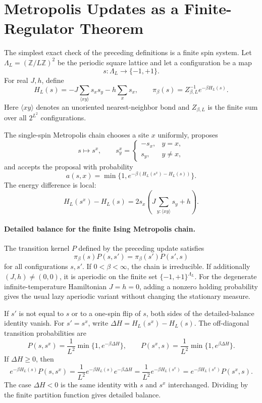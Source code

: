 \section{Metropolis Updates as a Finite-Regulator Theorem}

The simplest exact check of the preceding definitions is a finite spin system.
Let \(\Lambda_L=(\mathbb Z/L\mathbb Z)^2\) be the periodic square lattice and
let a configuration be a map
\[
  s:\Lambda_L\to\{-1,+1\}.
\]
For real \(J,h\), define
\[
  H_L(s)
  =
  -J\sum_{\langle xy\rangle}s_xs_y-h\sum_xs_x ,
  \qquad
  \pi_\beta(s)=Z_{\beta,L}^{-1}e^{-\beta H_L(s)} .
\]
Here \(\langle xy\rangle\) denotes an unoriented nearest-neighbor bond and
\(Z_{\beta,L}\) is the finite sum over all \(2^{L^2}\) configurations.

The single-spin Metropolis chain chooses a site \(x\) uniformly, proposes
\[
  s\longmapsto s^x,\qquad
  s^x_y=
  \begin{cases}
    -s_x,& y=x,\\
    s_y,& y\neq x,
  \end{cases}
\]
and accepts the proposal with probability
\[
  a(s,x)=\min\{1,e^{-\beta(H_L(s^x)-H_L(s))}\}.
\]
The energy difference is local:
\[
  H_L(s^x)-H_L(s)
  =
  2s_x\left(J\sum_{y:\langle xy\rangle}s_y+h\right).
\]

\paragraph{Detailed balance for the finite Ising Metropolis chain.}
The transition kernel \(P\) defined by the preceding update satisfies
\[
  \pi_\beta(s)P(s,s')=\pi_\beta(s')P(s',s)
\]
for all configurations \(s,s'\).  If \(0<\beta<\infty\), the chain is
irreducible.  If additionally \((J,h)\neq(0,0)\), it is aperiodic on the
finite set \(\{-1,+1\}^{\Lambda_L}\).  For the degenerate infinite-temperature
Hamiltonian \(J=h=0\), adding a nonzero holding probability gives the usual
lazy aperiodic variant without changing the stationary measure.

If \(s'\) is not equal to \(s\) or to a one-spin flip of \(s\), both sides of
the detailed-balance identity vanish.  For \(s'=s^x\), write
\(\Delta H=H_L(s^x)-H_L(s)\).  The off-diagonal transition probabilities are
\[
  P(s,s^x)=\frac1{L^2}\min\{1,e^{-\beta\Delta H}\},
  \qquad
  P(s^x,s)=\frac1{L^2}\min\{1,e^{\beta\Delta H}\}.
\]
If \(\Delta H\geq0\), then
\[
  e^{-\beta H_L(s)}P(s,s^x)
  =
  \frac1{L^2}e^{-\beta H_L(s)}e^{-\beta\Delta H}
  =
  \frac1{L^2}e^{-\beta H_L(s^x)}
  =
  e^{-\beta H_L(s^x)}P(s^x,s).
\]
The case \(\Delta H<0\) is the same identity with \(s\) and \(s^x\)
interchanged.  Dividing by the finite partition function gives detailed
balance.

